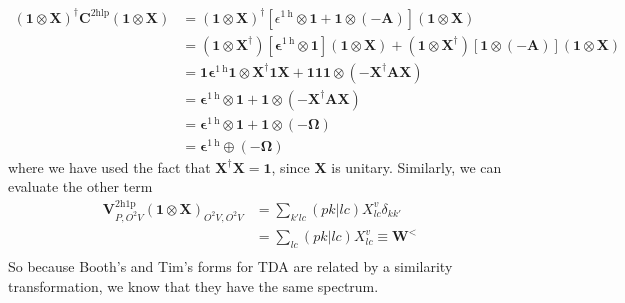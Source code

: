 \begin{align}
    \left( \bm{1} \otimes \bm{X } \right)^\dagger \bm{C}^{2 \mathrm{hlp}} \left( \bm{1} \otimes \bm{X } \right) &= \left( \bm{1} \otimes \bm{X } \right)^\dagger \left[\epsilon^{1 \mathrm{~h}} \otimes \bm{1} + \bm{1} \otimes (-\bm{A})\right] \left( \bm{1} \otimes \bm{X } \right) \\
&= \left( \bm{1} \otimes \bm{X }^\dagger \right) \left[\bm{\epsilon}^{1 \mathrm{~h}} \otimes \bm{1}\right] \left( \bm{1} \otimes \bm{X } \right) + \left( \bm{1} \otimes \bm{X }^\dagger \right) \left[\bm{1} \otimes (-\bm{A})\right] \left( \bm{1} \otimes \bm{X } \right)\\
&= \bm{1}\bm{\epsilon}^{1 \mathrm{~h}}\bm{1} \otimes \bm{X }^\dagger \bm{1} \bm{X } + \bm{1} \bm{1} \bm{1} \otimes (-\bm{X }^\dagger \bm{A} \bm{X }) \\
&= \bm{\epsilon}^{1 \mathrm{~h}} \otimes \bm{1} + \bm{1} \otimes (-\bm{X }^\dagger \bm{A} \bm{X }) \\
&= \bm{\epsilon}^{1 \mathrm{~h}} \otimes \bm{1} + \bm{1} \otimes (-\bm{\Omega }) \\
&= \bm{\epsilon}^{1 \mathrm{~h}} \oplus (-\bm{\Omega }) 
\end{align}
where we have used the fact that $\bm{X}^\dag \bm{X} = \bm{1}$, since $\bm{X}$ is unitary. Similarly, we can evaluate the other term
\begin{align}
    \bm{V}^{2 \mathrm{h1p}}_{P,O^2V}\left( \bm{1}\otimes \bm{X }\right)_{O^2V,O^2V} &= \sum_{k'lc} (pk|lc) X_{lc}^{v} \delta_{kk'}\\
&= \sum_{lc} (pk|lc) X_{lc}^{v}
 \equiv \bm{W}^< \\
\end{align}
So because Booth's and Tim's forms for TDA are related by a similarity transformation, we know that they have the same spectrum.

